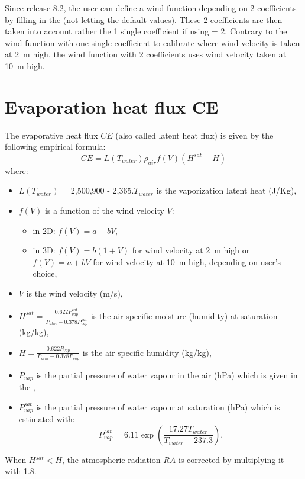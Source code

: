 Since release 8.2, the user can define a wind function depending on 2 coefficients
by filling in the 
(not letting the default values).
These 2 coefficients are then taken into account rather the 1 single coefficient
if using  = 2.
Contrary to the wind function with one single coefficient to calibrate where
wind velocity is taken at 2~m high, the wind function with 2 coefficients
uses wind velocity taken at 10~m high.


\section{Evaporation heat flux CE}

The evaporative heat flux $CE$ (also called latent heat flux)
is given by the following empirical formula:
\begin{equation*}
CE = L(T_{water})\rho_{air}f(V) \left(H^{sat}-H \right)
\end{equation*}
where:
\begin{itemize}
\item $L(T_{water})$ = 2,500,900 - 2,365.$T_{water}$ is the vaporization latent heat (J/Kg),
\item $f(V)$ is a function of the wind velocity $V$:
  \begin{itemize}
  \item in 2D: $f(V) = a+bV$,
  \item in 3D: $f(V) = b(1+V)$ for wind velocity at 2~m high
    or $f(V) = a+bV$ for wind velocity at 10~m high,
    depending on user's choice,
  \end{itemize}
\item $V$ is the wind velocity (m/s),
\item $H^{sat}=\frac{0.622P^{sat}_{vap}}{P_{atm}-0.378P^{sat}_{vap}}$
is the air specific moisture (humidity) at saturation (kg/kg),
\item $H = \frac{0.622P_{vap}}{P_{atm}-0.378P_{vap}}$ is the air specific humidity (kg/kg),
\item $P_{vap}$ is the partial pressure of water vapour in the air (hPa)
which is given in the ,
\item $P^{sat}_{vap}$ is the partial pressure of water vapour at saturation (hPa) which is estimated with:
\begin{equation*}
P^{sat}_{vap} = 6.11 \exp \left(\frac{17.27T_{water}}{T_{water}+237.3} \right).
\end{equation*}
\end{itemize}

When $H{}^{sat} < H$, the atmospheric radiation $RA$ is corrected by multiplying it with 1.8.
